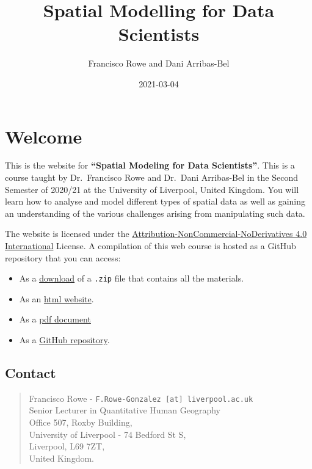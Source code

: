 \documentclass[
]{book}
\title{Spatial Modelling for Data Scientists}
\author{Francisco Rowe and Dani Arribas-Bel}
\date{2021-03-04}
\providecommand{\tightlist}{%
  \setlength{\itemsep}{0pt}\setlength{\parskip}{0pt}}
\begin{document}
\maketitle

{
\setcounter{tocdepth}{1}
\tableofcontents
}
\hypertarget{welcome}{%
\chapter*{Welcome}\label{welcome}}

This is the website for \textbf{``Spatial Modeling for Data Scientists''}. This is a course taught by Dr.~Francisco Rowe and Dr.~Dani Arribas-Bel in the Second Semester of 2020/21 at the University of Liverpool, United Kingdom. You will learn how to analyse and model different types of spatial data as well as gaining an understanding of the various challenges arising from manipulating such data.

The website is licensed under the \href{https://creativecommons.org/licenses/by-nc-nd/4.0/}{Attribution-NonCommercial-NoDerivatives 4.0 International} License. A compilation of this web course is hosted as a GitHub repository that you can access:

\begin{itemize}
\tightlist
\item
  As a \href{https://github.com/GDSL-UL/san/archive/master.zip}{download} of a \texttt{.zip} file that contains all the materials.
\item
  As an \href{https://gdsl-ul.github.io/san/}{html website}.
\item
  As a \href{https://gdsl-ul.github.io/san/spatial_analysis_notes.pdf}{pdf document}
\item
  As a \href{https://github.com/GDSL-UL/san}{GitHub repository}.
\end{itemize}

\hypertarget{contact}{%
\section*{Contact}\label{contact}}

\begin{quote}
Francisco Rowe - \texttt{F.Rowe-Gonzalez\ {[}at{]}\ liverpool.ac.uk}\\
Senior Lecturer in Quantitative Human Geography\\
Office 507, Roxby Building,\\
University of Liverpool - 74 Bedford St S,\\
Liverpool, L69 7ZT,\\
United Kingdom.
\end{quote}
\end{document}
